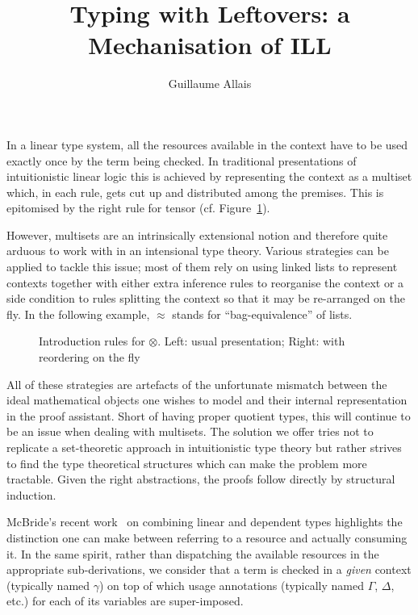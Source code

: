 \documentclass[a4paper]{easychair}
\title{Typing with Leftovers: a Mechanisation of ILL}
\author{Guillaume Allais \inst{1}}
\institute{
  Radboud University
  Nijmegen, The Netherlands
  \email{gallais@cs.ru.nl}}
\begin{document}
\maketitle

In a linear type system, all the resources available in the context
have to be used exactly once by the term being checked. In traditional
presentations of intuitionistic linear logic this is achieved by
representing the context as a multiset which, in each rule, gets cut
up and distributed among the premises. This is epitomised
by the right rule for tensor (cf. Figure~\ref{rule:tensor}).

However, multisets are an intrinsically extensional notion and
therefore quite arduous to work with in an intensional type
theory. Various strategies can be applied to tackle this issue;
most of them rely on using linked lists to represent contexts
together with either extra inference rules to reorganise the
context or a side condition to rules splitting the context so
that it may be re-arranged on the fly. In the following example,
$≈$ stands for ``bag-equivalence'' of lists.

\begin{figure}[ht]
\caption{Introduction rules for $⊗$.
         Left: usual presentation;
         Right: with reordering on the fly\label{rule:tensor}}
\end{figure}

All of these strategies are artefacts of the unfortunate mismatch
between the ideal mathematical objects one wishes to model and
their internal representation in the proof assistant. Short of
having proper quotient types, this will continue to be an issue
when dealing with multisets. The solution we offer tries not to
replicate a set-theoretic approach in intuitionistic type theory
but rather strives to find the type theoretical structures which
can make the problem more tractable. Given the right abstractions,
the proofs follow directly by structural induction.

McBride's recent work~\cite{McBride2016} on combining linear and
dependent types highlights the distinction one can make between
referring to a resource and actually consuming it. In the same spirit,
rather than dispatching the available resources in the appropriate
sub-derivations, we consider that a term is checked in a \emph{given}
context (typically named $γ$) on top of which usage annotations
(typically named $Γ$, $Δ$, etc.) for each of its variables are
super-imposed.
\end{document}
